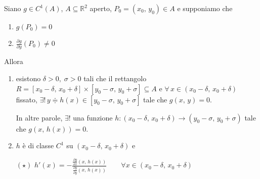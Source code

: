 \begin{thm}
Siano $g \in C^1(A)$, $A \subseteq \mathbb{R}^2$ aperto, $P_0 = (x_0,\,y_0) \in A$ e supponiamo che
\begin{enumerate}[labelindent=\parindent,leftmargin=*,label=\textnormal{(\roman*)},start=1]
\item $g(P_0) = 0$
\item $\displaystyle \frac{\partial g}{\partial y}(P_0) \neq 0$
\end{enumerate}
Allora
\begin{enumerate}[labelindent=\parindent,leftmargin=*,label=\textnormal{(D\arabic*)},start=1]
\item esistono $\delta > 0,\; \sigma > 0$ tali che il rettangolo $R = [x_0 - \delta,\, x_0 + \delta] \times [y_0 - \sigma,\, y_0 + \sigma] \subseteq A$ e $\forall \, x \in (x_0 - \delta,\, x_0 + \delta)$ fissato, $\exists ! \, y \doteqdot h(x) \in [y_0 - \sigma,\,y_0 + \sigma]$ tale che $g(x,\,y) = 0$.

In altre parole, $\exists !$ una funzione $h : (x_0 - \delta,\, x_0 + \delta) \longrightarrow (y_0 - \sigma,\, y_0 + \sigma)$ tale che $g(x,\,h(x)) = 0$.

\item $h$ è di classe $C^1$ su $(x_0 - \delta,\, x_0 + \delta)$ e
\begin{center}
$\mathrm{(\star)}$
\hfill
$\displaystyle
h'(x) = - \frac{\displaystyle \frac{\partial g}{\partial x} \left( x,\,h(x) \right)}{\displaystyle \frac{\partial g}{\partial y} \left( x,\,h(x) \right)}
\qquad \forall x \in (x_0 - \delta,\, x_0 + \delta)
$
\hfill \null \\
\end{center}
\end{enumerate}
\end{thm}
